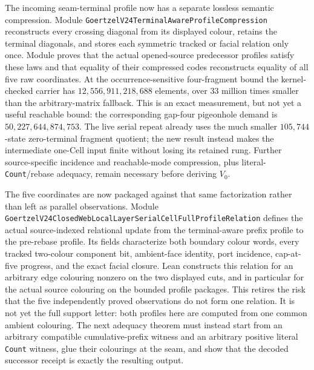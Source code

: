 \documentclass[11pt]{article}
\theoremstyle{definition}
\begin{document}
The incoming seam-terminal profile now has a separate lossless semantic
compression.  Module
\texttt{GoertzelV24TerminalAwareProfileCompression} reconstructs every
crossing diagonal from its displayed colour, retains the terminal diagonals,
and stores each symmetric tracked or facial relation only once.  Module
proves that the actual opened-source predecessor profiles satisfy these laws
and that equality of their compressed codes reconstructs equality of all five
raw coordinates.  At the occurrence-sensitive four-fragment bound the
kernel-checked carrier has $12{,}556{,}911{,}218{,}688$ elements, over
$33$ million times smaller than the arbitrary-matrix fallback.  This is an
exact measurement, but not yet a useful reachable bound: the corresponding
gap-four pigeonhole demand is $50{,}227{,}644{,}874{,}753$.  The live serial
repeat already uses the much smaller $105{,}744$-state zero-terminal fragment
quotient; the new result instead makes the intermediate one-Cell input finite
without losing its retained rung.  Further source-specific incidence and
reachable-mode compression, plus literal-\texttt{Count}/rebase adequacy, remain
necessary before deriving $V_0$.

The five coordinates are now packaged against that same factorization rather
than left as parallel observations.  Module
\texttt{GoertzelV24ClosedWebLocalLayerSerialCellFullProfileRelation} defines
the actual source-indexed relational update from the terminal-aware prefix
profile to the pre-rebase profile.  Its fields characterize both boundary
colour words, every tracked two-colour component bit, ambient-face identity,
port incidence, cap-at-five progress, and the exact facial closure.  Lean
constructs this relation for an arbitrary edge colouring nonzero on the two
displayed cuts, and in particular for the actual source colouring on the
bounded profile packages.  This retires the risk that the five independently
proved observations do not form one relation.  It is not yet the full support
letter: both profiles here are computed from one common ambient colouring.
The next adequacy theorem must instead start from an arbitrary compatible
cumulative-prefix witness and an arbitrary positive literal
\texttt{Count} witness, glue their colourings at the seam, and show that the
decoded successor receipt is exactly the resulting output.
\end{document}
